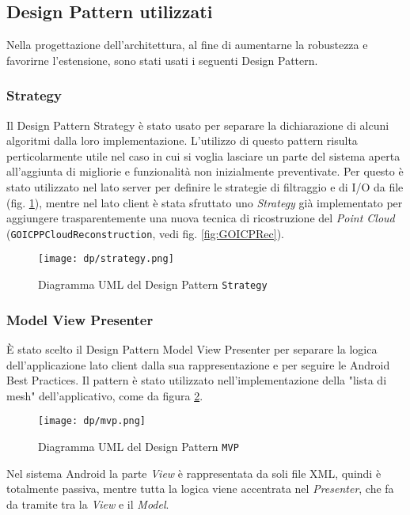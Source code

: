 \subsection{Design Pattern utilizzati}
Nella progettazione dell'architettura, al fine di aumentarne la robustezza e favorirne l'estensione, sono stati usati i seguenti Design Pattern.

\subsubsection{Strategy}
Il Design Pattern Strategy è stato usato per separare la dichiarazione di alcuni algoritmi
dalla loro implementazione. L'utilizzo di questo pattern risulta perticolarmente utile nel caso in cui si voglia lasciare un parte del sistema aperta all'aggiunta di migliorie e funzionalità non inizialmente preventivate. Per questo è stato utilizzato nel lato server per definire le strategie di filtraggio e di I/O da file (fig. \ref{fig:strategy}), mentre nel lato client è stata sfruttato uno \emph{Strategy} già implementato per aggiungere trasparentemente una nuova tecnica di ricostruzione del \emph{Point Cloud} (\texttt{GOICPPCloudReconstruction}, vedi fig. \ref{fig:GOICPRec}).
\begin{figure}[!h] 
    \centering 
    \texttt{[image: dp/strategy.png]} 
    \caption{Diagramma UML del Design Pattern \texttt{Strategy}}
   \label{fig:strategy}
\end{figure}

\subsubsection{Model View Presenter}
È stato scelto il Design Pattern Model View Presenter per separare la logica dell’applicazione lato client dalla sua rappresentazione e per seguire le Android Best Practices. Il pattern è stato utilizzato nell'implementazione della "lista di mesh" dell'applicativo, come da figura \ref{fig:mvp}.
\begin{figure}[!h] 
    \centering 
    \texttt{[image: dp/mvp.png]} 
    \caption{Diagramma UML del Design Pattern \texttt{MVP}}
   \label{fig:mvp}
\end{figure}
\newline
Nel sistema Android la parte \emph{View} è rappresentata da soli file XML, quindi è totalmente passiva, mentre tutta la logica viene accentrata nel \emph{Presenter}, che fa da tramite tra la  \emph{View} e il \emph{Model}.

